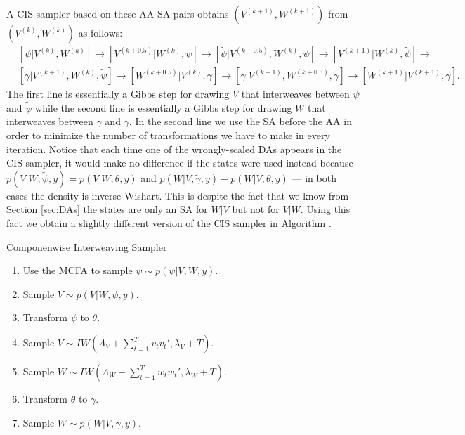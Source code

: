\documentclass[12pt]{article}
\begin{document}
A CIS sampler based on these AA-SA pairs obtains $(V^{(k+1)},W^{(k+1)})$ from $(V^{(k)},W^{(k)})$ as follows:
\begin{align*}
&[\psi|V^{(k)},W^{(k)}] \to [V^{(k+0.5)}|W^{(k)},\psi] \to [\tilde{\psi}|V^{(k+0.5)},W^{(k)},\psi] \to [V^{(k+1)}|W^{(k)},\tilde{\psi}]\to\\
&[\tilde{\gamma}|V^{(k+1)},W^{(k)},\tilde{\psi}] \to [W^{(k+0.5)}|V^{(k)},\tilde{\gamma}] \to [\gamma|V^{(k+1)},W^{(k+0.5)},\tilde{\gamma}]\to [W^{(k+1)}|V^{(k+1)},\gamma].
\end{align*}
The first line is essentially a Gibbs step for drawing $V$ that interweaves between $\psi$ and $\tilde{\psi}$ while the second line is essentially a Gibbs step for drawing $W$ that interweaves between $\gamma$ and $\tilde{\gamma}$. In the second line we use the SA before the AA in order to minimize the number of transformations we have to make in every iteration. Notice that each time one of the wrongly-scaled DAs appears in the CIS sampler, it would make no difference if the states were used instead because $p(V|W,\tilde{\psi},y)=p(V|W,\theta,y)$ and $p(W|V,\tilde{\gamma},y)-p(W|V,\theta,y)$ --- in both cases the density is inverse Wishart. This is despite the fact that we know from Section \ref{sec:DAs} the states are only an SA for $W|V$ but not for $V|W$. Using this fact we obtain a slightly different version of the CIS sampler in Algorithm .
\begin{alg*}[CIS]Componenwise Interweaving Sampler\label{alg:DLMcis}
\begin{enumerate}
\item Use the MCFA to sample $\psi \sim p(\psi|V,W,y)$.
\item Sample $V \sim p(V|W,\psi,y)$.
\item Transform $\psi$ to $\theta$.
\item Sample $V \sim IW\left(\Lambda_V + \sum_{t=1}^Tv_tv_t',\lambda_V + T\right)$.
\item Sample $W \sim IW\left(\Lambda_W + \sum_{t=1}^Tw_tw_t',\lambda_{W} + T\right)$.
\item Transform $\theta$ to $\gamma$.
\item Sample $W \sim p(W|V,\gamma,y)$.
\end{enumerate}
\end{alg*}
\end{document}

